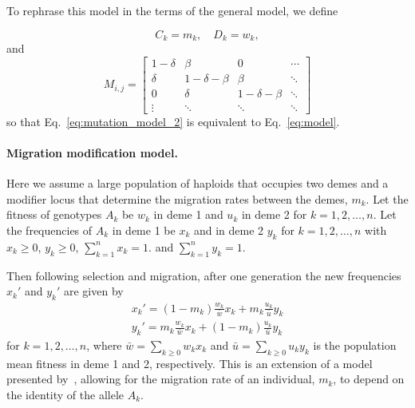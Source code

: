 \documentclass[9pt, a4paper, twocolumn]{extarticle}
\begin{document}
To rephrase this model in the terms of the general model, we define

\begin{equation}
C_k = m_k, \quad
D_k = w_k,
\end{equation}
and
\begin{equation}
M_{i,j} = \begin{bmatrix}
1-\delta & \beta & 0 &  \cdots \\
\delta & 1-\delta-\beta & \beta &  \ddots \\
0 & \delta & 1-\delta-\beta & \ddots \\
\vdots & \ddots & \ddots & \ddots 
\end{bmatrix}
\end{equation}
so that Eq.~\ref{eq:mutation_model_2} is equivalent to Eq.~\ref{eq:model}.


\paragraph*{Migration modification model.}\label{sec:mig_model_1}

Here we assume a large population of haploids that occupies two demes and a modifier locus that determine the migration rates between the demes, $m_k$. 
Let the fitness of genotypes $A_k$ be $w_k$ in deme 1 and $u_k$ in deme 2 for $k=1,2,\ldots,n$.
Let the frequencies of $A_k$ in deme 1 be $x_k$ and in deme 2 $y_k$ for $k=1,2,\ldots,n$ with $x_k \ge 0$, $y_k \ge 0$, $\sum_{k=1}^{n}{x_k} = 1$. and $\sum_{k=1}^{n}{y_k} = 1$.

Then following selection and migration, after one generation the new frequencies $x_k'$ and $y_k'$ are given by
\begin{align}
x_k' = (1-m_k) \frac{w_k}{\bar{w}} x_k + m_k \frac{u_k}{\bar{u}} y_k \\
y_k' = m_k \frac{w_k}{\bar{w}} x_k + (1 - m_k) \frac{u_k}{\bar{u}} y_k
\end{align}
for $k=1,2,\ldots,n$, where $\bar{w} = \sum_{k \ge 0}{w_k x_k}$ and $\bar{u} = \sum_{k \ge 0}{u_k y_k}$ is the population mean fitness in deme 1 and 2, respectively.
This is an extension of a model presented by~\citet{Altenberg2017}, allowing for the migration rate of an individual, $m_k$, to depend on the identity of the allele $A_k$.
\end{document}
